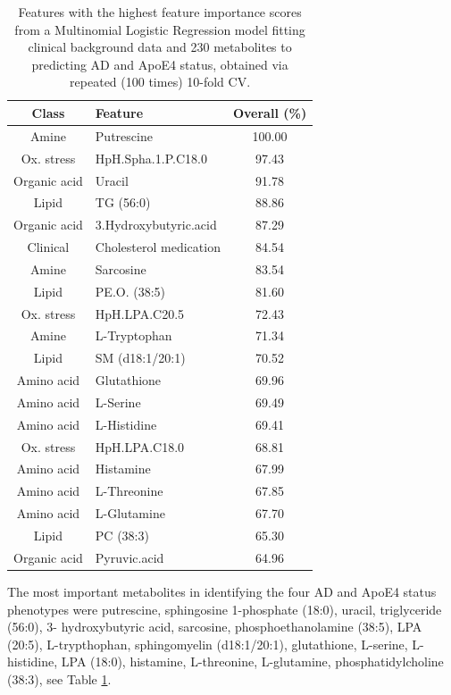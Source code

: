 \documentclass{amsart}
\begin{document}
\begin{table}[H] 
	\centering
	\caption{\label{tab:fimp} Features with the highest feature importance scores from a Multinomial Logistic Regression model fitting clinical background data and 230 metabolites to predicting AD and ApoE4 status, obtained via repeated (100 times) 10-fold CV.}
	\begin{tabular}{clc}
		\toprule
      Class &	Feature & Overall (\%) \\ \midrule
    Amine & Putrescine            & 100.00 \\
    Ox. stress & HpH.Spha.1.P.C18.0    & 97.43  \\
    Organic acid & Uracil         & 91.78  \\
    Lipid & TG (56:0)             & 88.86  \\
    Organic acid & 3.Hydroxybutyric.acid & 87.29  \\
    Clinical &    Cholesterol medication   & 84.54  \\
    Amine & Sarcosine             & 83.54  \\
    Lipid & PE.O. (38:5)           & 81.60  \\
    Ox. stress & HpH.LPA.C20.5         & 72.43  \\
    Amine & L-Tryptophan          & 71.34  \\
    Lipid & SM (d18:1/20:1)       & 70.52  \\
    Amino acid & Glutathione           & 69.96  \\
    Amino acid & L-Serine              & 69.49  \\
    Amino acid & L-Histidine           & 69.41  \\
    Ox. stress & HpH.LPA.C18.0         & 68.81  \\
    Amino acid & Histamine             & 67.99  \\
    Amino acid & L-Threonine           & 67.85  \\
    Amino acid & L-Glutamine           & 67.70  \\
    Lipid & PC (38:3)             & 65.30  \\
    Organic acid & Pyruvic.acid          & 64.96 \\ \bottomrule
	\end{tabular}
\end{table}
The most important metabolites in identifying the four AD and ApoE4 status phenotypes were putrescine, sphingosine 1-phosphate (18:0), uracil, triglyceride (56:0), 3- hydroxybutyric acid, sarcosine, phosphoethanolamine (38:5), LPA (20:5), L-trypthophan, sphingomyelin (d18:1/20:1), glutathione, L-serine, L-histidine, LPA (18:0), histamine, L-threonine, L-glutamine, phosphatidylcholine (38:3), see Table \ref{tab:fimp}. 
\end{document}
